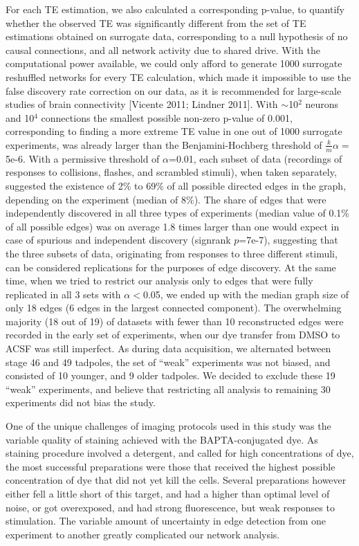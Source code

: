 \documentclass{article}
\begin{document}
For each TE estimation, we also calculated a corresponding p-value, to quantify whether the observed TE was significantly different from the set of TE estimations obtained on surrogate data, corresponding to a null hypothesis of no causal connections, and all network activity due to shared drive. With the computational power available, we could only afford to generate 1000 surrogate reshuffled networks for every TE calculation, which made it impossible to use the false discovery rate correction on our data, as it is recommended for large-scale studies of brain connectivity [Vicente 2011; Lindner 2011]. With $\sim$10$^2$ neurons and 10$^4$ connections the smallest possible non-zero p-value of 0.001, corresponding to finding a more extreme TE value in one out of 1000 surrogate experiments, was already larger than the Benjamini-Hochberg threshold of $\frac{k}{m}\alpha=$5e-6. With a permissive threshold of $\alpha$=0.01, each subset of data (recordings of responses to collisions, flashes, and scrambled stimuli), when taken separately, suggested the existence of 2\% to 69\% of all possible directed edges in the graph, depending on the experiment (median of 8\%). The share of edges that were independently discovered in all three types of experiments (median value of 0.1\% of all possible edges) was on average 1.8 times larger than one would expect in case of spurious and independent discovery (signrank $p$=7e-7), suggesting that the three subsets of data, originating from responses to three different stimuli, can be considered replications for the purposes of edge discovery. At the same time, when we tried to restrict our analysis only to edges that were fully replicated in all 3 sets with $\alpha < $0.05, we ended up with the median graph size of only 18 edges (6 edges in the largest connected component). The overwhelming majority (18 out of 19) of datasets with fewer than 10 reconstructed edges were recorded in the early set of experiments, when our dye transfer from DMSO to ACSF was still imperfect. As during data acquisition, we alternated between stage 46 and 49 tadpoles, the set of “weak” experiments was not biased, and consisted of 10 younger, and 9 older tadpoles. We decided to exclude these 19 “weak” experiments, and believe that restricting all analysis to remaining 30 experiments did not bias the study.

One of the unique challenges of imaging protocols used in this study was the variable quality of staining achieved with the BAPTA-conjugated dye. As staining procedure involved a detergent, and called for high concentrations of dye, the most successful preparations were those that received the highest possible concentration of dye that did not yet kill the cells. Several preparations however either fell a little short of this target, and had a higher than optimal level of noise, or got overexposed, and had strong fluorescence, but weak responses to stimulation. The variable amount of uncertainty in edge detection from one experiment to another greatly complicated our network analysis.
\end{document}
